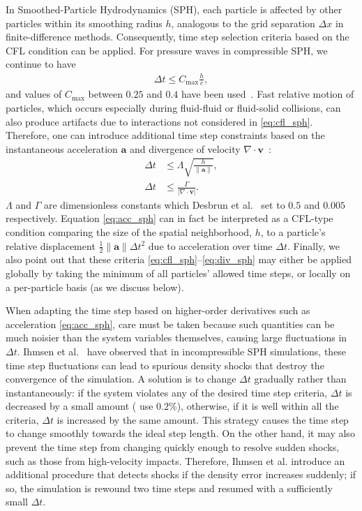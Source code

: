In Smoothed-Particle Hydrodynamics (SPH), each particle is affected by other particles within its smoothing radius $h$, analogous to the grid separation $\Delta x$ in finite-difference methods.
Consequently, time step selection criteria based on the CFL condition can be applied.
For pressure waves in compressible SPH, we continue to have
\begin{align}
  \label{eq:cfl_sph}
  \Delta t \le C_{\max}\frac hc,
\end{align}
and values of $C_{\max}$ between $0.25$ and $0.4$ have been used~\cite{Monaghan1992,Desbrun1999}.
Fast relative motion of particles, which occurs especially during fluid-fluid or fluid-solid collisions, can also produce artifacts due to interactions not considered in \eqref{eq:cfl_sph}.
Therefore, one can introduce additional time step constraints based on the instantaneous acceleration $\mathbf a$ and divergence of velocity $\nabla \cdot \mathbf v$~\cite{Monaghan1992,Desbrun1999}:
\begin{align}
    \label{eq:acc_sph}
    \Delta t &\leq \Lambda \sqrt{\frac{h}{\|\mathbf a\|}}, \\
    \label{eq:div_sph}
    \Delta t &\leq \frac{\Gamma}{|\nabla \cdot \mathbf v|}.
\end{align}
$\Lambda$ and $\Gamma$ are dimensionless constants which Desbrun et al.~\cite{Desbrun1999} set to $0.5$ and $0.005$ respectively.
Equation \eqref{eq:acc_sph} can in fact be interpreted as a CFL-type condition comparing the size of the spatial neighborhood, $h$, to a particle's relative displacement $\frac12\|\mathbf a\|\Delta t^2$ due to acceleration over time $\Delta t$.
Finally, we also point out that these criteria \eqref{eq:cfl_sph}--\eqref{eq:div_sph} may either be applied globally by taking the minimum of all particles' allowed time steps, or locally on a per-particle basis (as we discuss below).

When adapting the time step based on higher-order derivatives such as acceleration \eqref{eq:acc_sph}, care must be taken because such quantities can be much noisier than the system variables themselves, causing large fluctuations in $\Delta t$.
Ihmsen et al.~\cite{Ihmsen2010} have observed that in incompressible SPH simulations, these time step fluctuations can lead to spurious density shocks that destroy the convergence of the simulation.
A solution is to change $\Delta t$ gradually rather than instantaneously: if the system violates any of the desired time step criteria, $\Delta t$ is decreased by a small amount (\cite{Ihmsen2010} use $0.2\%$), otherwise, if it is well within all the criteria, $\Delta t$ is increased by the same amount.
This strategy causes the time step to change smoothly towards the ideal step length.
On the other hand, it may also prevent the time step from changing quickly enough to resolve sudden shocks, such as those from high-velocity impacts.
Therefore, Ihmsen et al. introduce an additional procedure that detects shocks if the density error increases suddenly; if so, the simulation is rewound two time steps and resumed with a sufficiently small $\Delta t$.
